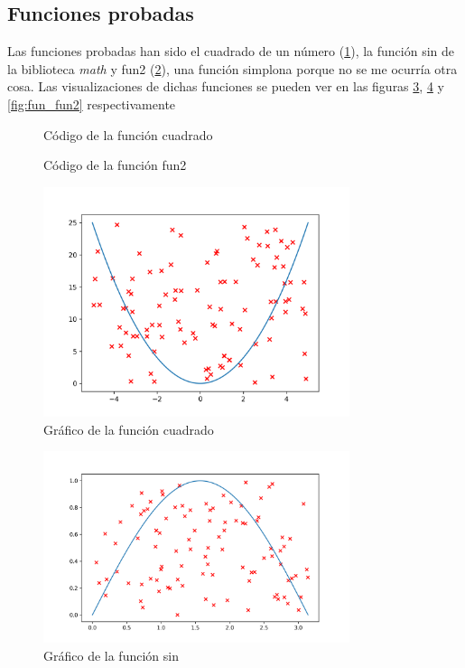 \documentclass[6pt]{AiTex}
\begin{document}
\subsection{Funciones probadas}

Las funciones probadas han sido el \textcolor{codepurple}{cuadrado} de un número (\ref{fig:cuadrado}), la función \textcolor{codepurple}{sin} de la biblioteca \textit{math} y \textcolor{codepurple}{fun2} (\ref{fig:fun2}), una función simplona porque no se me ocurría otra cosa. Las visualizaciones de dichas funciones se pueden ver en las figuras \ref{fig:fun_cuadrado}, \ref{fig:fun_seno} y \ref{fig:fun_fun2} respectivamente

\begin{figure}[H]
    \centering
    
    \caption{Código de la función cuadrado}
    \label{fig:cuadrado}
\end{figure}

\begin{figure}[H]
    \centering
    
    \caption{Código de la función fun2}
    \label{fig:fun2}
\end{figure}

\begin{figure}[H]
    \centering
    \includegraphics[width=0.8\textwidth]{./imagenes/cuadrado.png}
    \caption{Gráfico de la función cuadrado}
    \label{fig:fun_cuadrado}
\end{figure}

\begin{figure}[H]
    \centering
    \includegraphics[width=0.8\textwidth]{./imagenes/sin.png}
    \caption{Gráfico de la función sin}
    \label{fig:fun_seno}
\end{figure}
\end{document}
